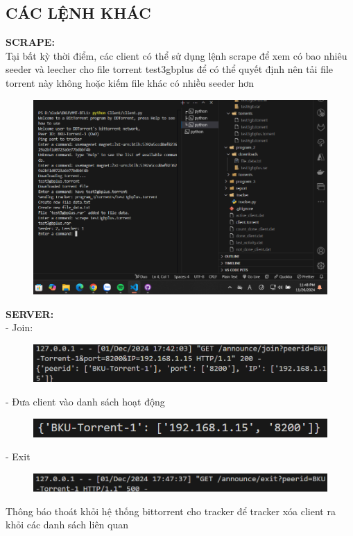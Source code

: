 \documentclass[a4paper]{article}
\begin{document}
\subsection{CÁC LỆNH KHÁC}
\noindent \textbf{SCRAPE:}\\
Tại bất kỳ thời điểm, các client có thể sử dụng lệnh scrape để xem có bao nhiêu seeder và leecher cho file torrent test3gbplus để có thể quyết định nên tải file torrent này không hoặc kiếm file khác có nhiều seeder hơn
\begin{figure}[H]
    \centering
    \includegraphics[width=1\textwidth]{images/39.png}
    \captionsetup{labelformat=empty}
\end{figure}
\noindent \textbf{SERVER:}\\
\indent - Join:
\begin{figure}[H]
    \centering
    \includegraphics[width=1\textwidth]{images/36.png}
    \captionsetup{labelformat=empty}
\end{figure}
- Đưa client vào danh sách hoạt động
\begin{figure}[H]
    \centering
    \includegraphics[width=1\textwidth]{images/37.png}
    \captionsetup{labelformat=empty}
\end{figure}
- Exit
\begin{figure}[H]
    \centering
    \includegraphics[width=1\textwidth]{images/38.png}
    \captionsetup{labelformat=empty}
\end{figure}
Thông báo thoát khỏi hệ thống bittorrent cho tracker để tracker xóa client ra khỏi các danh sách liên quan	
\end{document}
